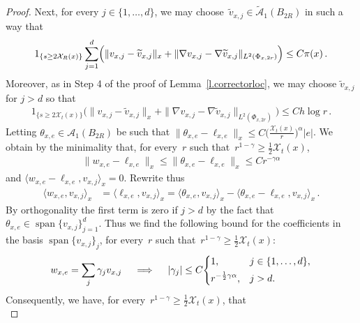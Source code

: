 \documentclass[11pt]{article} %
\numberwithin{equation}{section}
\theoremstyle{definition}
\let\originalleft\left
\let\originalright\right
\renewcommand{\left}{\mathopen{}\mathclose\bgroup\originalleft}
\renewcommand{\right}{\aftergroup\egroup\originalright}
\renewcommand*{\tilde}{\widetilde}
\newcommand{\X}{\mathcal{X}}
\newcommand{\indc}{1}
\DeclareMathOperator{\spn}{span}
\newcommand{\A}{\mathcal{A}}
\begin{document}
\begin{proof}
\smallskip

Next, for every $j \in \{1,\ldots,d \}$, we may choose~$\tilde v_{x,j} \in \tilde{\A}_1(B_{2R})$ in such a way that 
\begin{align*}  
\indc_{\{ s \geq 2\X_R(x) \}}  
\sum_{j=1}^d \Bigl( 
\| v_{x,j} - \tilde v_{x,j} \|_x 
+
\| \nabla v_{x,j} - \nabla \tilde v_{x,j} \|_{L^2(\Phi_{x,2r})}
\Bigr)
\leq 
C \pi(x) 
\,.
\end{align*}
Moreover, as in Step 4 of the proof of Lemma~\ref{l.correctorloc}, we may choose $\tilde v_{x,j} $ for $j>d$ so that 
\begin{align}  \label{e.Malliavin.basebound}
\indc_{\{ s \geq 2\X_t(x) \}}  
\bigl( 
\| v_{x,j} - \tilde v_{x,j} \|_x 
+ 
\| \nabla v_{x,j} - \nabla \tilde v_{x,j} \|_{L^2(\Phi_{x,2r})}  
\bigr)
\leq 
C h \log r
\,.
\end{align}
Letting $\theta_{x,e} \in \A_1(B_{2R})$ be such that $\| \theta_{x,e} - \ell_{x,e} \|_x \leq C \bigl(\frac{\X_t(x)}{r} \bigr)^\alpha|e|$. We obtain by the minimality that, for every~$r$ such that~$r^{1-\gamma} \geq \frac12 \X_t(x)$,
\begin{align}  \label{e.Malliavin.evenmoresilly}
 \| w_{x,e} - \ell_{x,e}  \|_x  \leq  \| \theta_{x,e} - \ell_{x,e}  \|_x \leq C r^{-\gamma \alpha}
\end{align}
and $\langle w_{x,e} - \ell_{x,e}  , v_{x,j}  \rangle_x  = 0$. Rewrite thus 
\begin{align*}  
\langle w_{x,e}  , v_{x,j}  \rangle_x 
& = 
\langle \ell_{x,e}  , v_{x,j}  \rangle_x
= \langle \theta_{x,e} , v_{x,j}  \rangle_x 
- \langle \theta_{x,e} - \ell_{x,e}  , v_{x,j}  \rangle_x 
\,.
\end{align*}
By orthogonality the first term is zero if $j>d$ by the fact that $\theta_{x,e} \in \spn \{v_{x,j}\}_{j=1}^d$. Thus we find the following bound for the coefficients in the basis $ \spn \{v_{x,j}\}_{j}$,  for every~$r$ such that~$r^{1-\gamma} \geq \frac12 \X_t(x)$:
\begin{equation*}  
w_{x,e} = \sum_{j} \gamma_j  v_{x,j} 
\quad \implies \quad 
| \gamma_j | 
\leq 
C \left\{
\begin{aligned}
& 1
, & &
j \in \{1,\ldots,d\},
\\ 
& r^{-\frac12 \gamma \alpha}, & & j > d . 
\end{aligned}
\right.
\end{equation*}
Consequently, we have, for every~$r^{1-\gamma} \geq \frac12 \X_t(x)$, that 
\begin{equation}  \label{e.Malliavin.silly}

\end{equation}
\end{proof}
\end{document}
